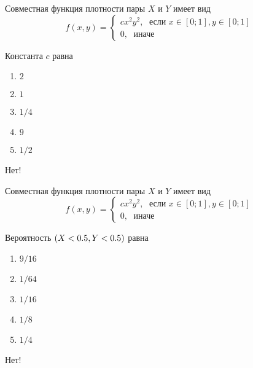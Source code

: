 \documentclass[t]{beamer}
\let\P\relax
\DeclareMathOperator{\P}{\mathbb{P}}
\begin{document}
 \begin{frame} \label{20-No} 
\begin{block}{20} 

Совместная функция плотности пары $X$ и $Y$ имеет вид
\[
f(x,y)=\begin{cases}
cx^2y^2, \; \text{ если } x\in[0;1], y\in [0;1] \\
0, \; \text{ иначе}
\end{cases}
\]

\vspace{0.5cm} 
 
 
Константа $c$ равна
 


 \end{block} 
\begin{enumerate} 
\item[] \hyperlink{20-No}{\beamergotobutton{} $2$
}
\item[] \hyperlink{20-No}{\beamergotobutton{} $1$}
\item[] \hyperlink{20-No}{\beamergotobutton{} $1/4$}
\item[] \hyperlink{20-Yes}{\beamergotobutton{} $9$}
\item[] \hyperlink{20-No}{\beamergotobutton{} $1/2$}
\end{enumerate} 

 \alert{Нет!} 
\end{frame} 


 \begin{frame} \label{21-No} 
\begin{block}{21} 

Совместная функция плотности пары $X$ и $Y$ имеет вид
\[
f(x,y)=\begin{cases}
cx^2y^2, \; \text{ если } x\in[0;1], y\in [0;1] \\
0, \; \text{ иначе}
\end{cases}
\]

\vspace{0.5cm} 
 
 
Вероятность $\P(X<0.5, Y<0.5)$ равна
 


 \end{block} 
\begin{enumerate} 
\item[] \hyperlink{21-No}{\beamergotobutton{} $9/16$
}
\item[] \hyperlink{21-Yes}{\beamergotobutton{} $1/64$}
\item[] \hyperlink{21-No}{\beamergotobutton{} $1/16$}
\item[] \hyperlink{21-No}{\beamergotobutton{} $1/8$}
\item[] \hyperlink{21-No}{\beamergotobutton{} $1/4$}
\end{enumerate} 

 \alert{Нет!} 
\end{frame} 
\end{document}
